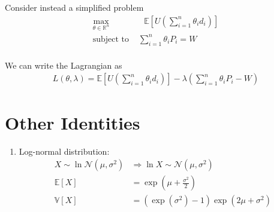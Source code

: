 \documentclass[12pt,twoside]{article}
\begin{document}
\begin{enumerate}
	Consider instead a simplified problem 
		\begin{align*}
			\max_{\theta \in \mathbb{R}^n} 	& \text{ }\mathbb{E} \left[U\left(\sum_{i=1}^n \theta_id_i\right)	 \right]\\
			\text{subject to }							& \sum_{i=1}^n \theta_iP_i = W\\
		\end{align*}
	
	We can write the Lagrangian as 
		\begin{align*}
			L(\theta, \lambda) = \mathbb{E}\left[U\left(\sum_{i=1}^n \theta_id_i\right) \right] - \lambda \left(\sum_{i=1}^n \theta_i P_i - W\right)
		\end{align*}

\end{enumerate}




\section{Other Identities}
\begin{enumerate}
	\item Log-normal distribution: 
	\begin{align*}
		X \sim \ln \mathcal{N}(\mu, \sigma^2) & \Rightarrow \ln X \sim \mathcal{N}(\mu, \sigma^2) \\
		\mathbb{E}[X] 	& = \exp\left(\mu+ \frac{\sigma^2}{2} \right)\\
		\mathbb{V}[X] 	& =\left(\exp(\sigma^2) - 1\right) \exp\left(2\mu+ \sigma^2 \right)
	\end{align*}

\end{enumerate}
\end{document}
